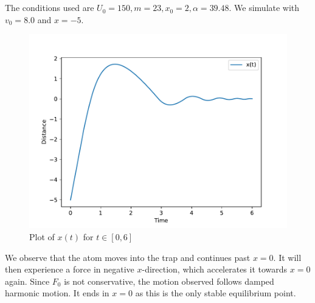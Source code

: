 \documentclass[a4paper,10pt,english]{article}
\begin{document}
\section{}


\section{}
The conditions used are $U_0 = 150, m = 23, x_0 = 2, \alpha = 39.48$. We simulate with $v_0 = 8.0$ and $x=-5$.
\begin{figure}[h!]
    \centering
    \includegraphics[scale=.7]{plot_integrated_v0_8.pdf}
    \caption{Plot of $x(t)$ for $t\in[0, 6]$}
    \label{fig:fig_i}
\end{figure}

We observe that the atom moves into the trap and continues past $x=0$. It will then experience a force in negative $x$-direction, which accelerates it towards $x=0$ again. Since $F_0$ is not conservative, the motion observed follows damped harmonic motion. It ends in $x=0$ as this is the only stable equilibrium point. 

\newpage
\end{document}
